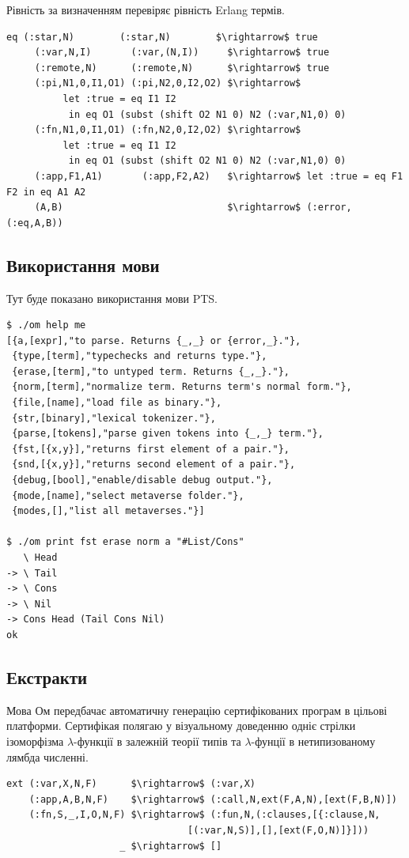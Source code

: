 Рівність за визначенням перевіряє рівність Erlang термів.

\begin{lstlisting}[mathescape=true]
  eq (:star,N)        (:star,N)        $\rightarrow$ true
     (:var,N,I)       (:var,(N,I))     $\rightarrow$ true
     (:remote,N)      (:remote,N)      $\rightarrow$ true
     (:pi,N1,0,I1,O1) (:pi,N2,0,I2,O2) $\rightarrow$
          let :true = eq I1 I2
           in eq O1 (subst (shift O2 N1 0) N2 (:var,N1,0) 0)
     (:fn,N1,0,I1,O1) (:fn,N2,0,I2,O2) $\rightarrow$
          let :true = eq I1 I2
           in eq O1 (subst (shift O2 N1 0) N2 (:var,N1,0) 0)
     (:app,F1,A1)       (:app,F2,A2)   $\rightarrow$ let :true = eq F1 F2 in eq A1 A2
     (A,B)                             $\rightarrow$ (:error,(:eq,A,B))
\end{lstlisting}

\subsection{Використання мови}
Тут буде показано використання мови PTS.

\begin{lstlisting}
$ ./om help me
[{a,[expr],"to parse. Returns {_,_} or {error,_}."},
 {type,[term],"typechecks and returns type."},
 {erase,[term],"to untyped term. Returns {_,_}."},
 {norm,[term],"normalize term. Returns term's normal form."},
 {file,[name],"load file as binary."},
 {str,[binary],"lexical tokenizer."},
 {parse,[tokens],"parse given tokens into {_,_} term."},
 {fst,[{x,y}],"returns first element of a pair."},
 {snd,[{x,y}],"returns second element of a pair."},
 {debug,[bool],"enable/disable debug output."},
 {mode,[name],"select metaverse folder."},
 {modes,[],"list all metaverses."}]

$ ./om print fst erase norm a "#List/Cons"
   \ Head
-> \ Tail
-> \ Cons
-> \ Nil
-> Cons Head (Tail Cons Nil)
ok
\end{lstlisting}

\subsection{Екстракти}

Мова Ом передбачає автоматичну генерацію сертифікованих програм в цільові платформи.
Сертифікая полягаю у візуальному доведенню одніє стрілки ізоморфізма
$\lambda$-функції в залежній теорії типів та $\lambda$-фунції в нетипизованому лямбда численні.

\begin{lstlisting}[mathescape=true]
ext (:var,X,N,F)      $\rightarrow$ (:var,X)
    (:app,A,B,N,F)    $\rightarrow$ (:call,N,ext(F,A,N),[ext(F,B,N)])
    (:fn,S,_,I,O,N,F) $\rightarrow$ (:fun,N,(:clauses,[{:clause,N,
                                [(:var,N,S)],[],[ext(F,O,N)]}]))
                    _ $\rightarrow$ []
\end{lstlisting}

